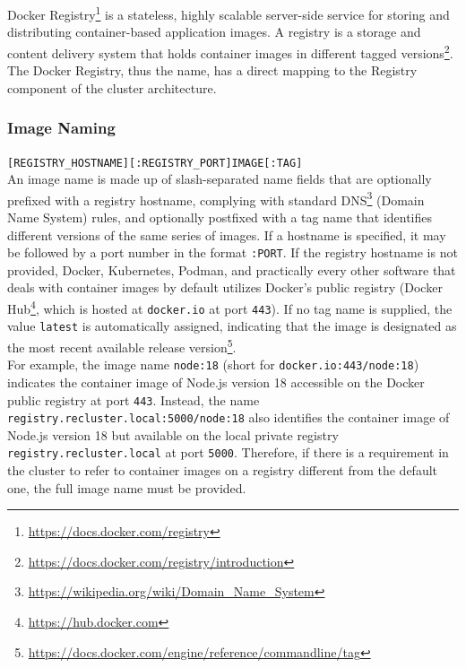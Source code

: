Docker Registry\footnote{\url{https://docs.docker.com/registry}} is a stateless,
highly scalable server-side service for storing and distributing container-based
application images. A registry is a storage and content delivery system that holds
container images in different tagged versions\footnote{\url{https://docs.docker.com/registry/introduction}}.
\\ %
The Docker Registry, thus the name, has a direct mapping to the Registry component
of the cluster architecture.

\clearpage


\subsubsection{Image Naming}
\label{subsubsec:implementation_dependencies_docker_registry_image_naming}

\texttt{[REGISTRY\_HOSTNAME][:REGISTRY\_PORT]IMAGE[:TAG]} \\ %
An image name is made up of slash-separated name fields that are optionally prefixed
with a registry hostname, complying with standard DNS\footnote{\url{https://wikipedia.org/wiki/Domain_Name_System}}
(Domain Name System) rules, and optionally postfixed with a tag name that identifies
different versions of the same series of images. If a hostname is specified, it may
be followed by a port number in the format \texttt{:PORT}. If the registry
hostname is not provided, Docker, Kubernetes, Podman, and practically every
other software that deals with container images by default utilizes Docker's
public registry (Docker Hub\footnote{\url{https://hub.docker.com}}, which is
hosted at \texttt{docker.io} at port \texttt{443}). If no tag name is supplied, the
value \texttt{latest} is automatically assigned, indicating that the image is designated
as the most recent available release version\footnote{\url{https://docs.docker.com/engine/reference/commandline/tag}}.
\\ %
For example, the image name \texttt{node:18} (short for \texttt{docker.io:443/node:18})
indicates the container image of Node.js version 18 accessible on the Docker
public registry at port \texttt{443}. Instead, the name \texttt{registry.recluster.local:5000/node:18}
also identifies the container image of Node.js version 18 but available on the
local private registry \texttt{registry.recluster.local} at port \texttt{5000}. Therefore,
if there is a requirement in the cluster to refer to container images on a
registry different from the default one, the full image name must be provided.

